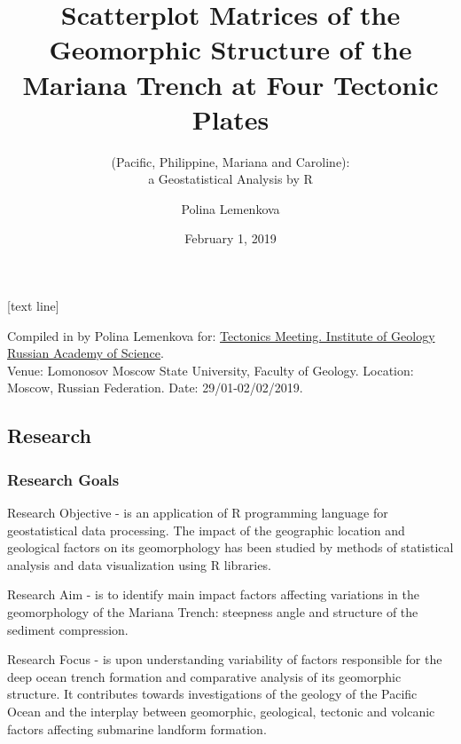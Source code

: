 \documentclass[pdflatex,compress,10pt,
	xcolor={dvipsnames,dvipsnames,svgnames,x11names,table},
	hyperref={colorlinks = true,breaklinks = true, urlcolor = NavyBlue, breaklinks = true}]{beamer}
\title{Scatterplot Matrices of the Geomorphic Structure of the Mariana Trench at Four Tectonic Plates}
\subtitle{(Pacific, Philippine, Mariana and Caroline): \\a Geostatistical Analysis by R}
\author{Polina Lemenkova}
\institute{Ocean University of China, College of Marine Geo-Sciences}
\date{February 1, 2019}
\begin{document}
\maketitle

[text line]{%
\parbox{\linewidth}{\vspace*{-8pt}Compiled in \LuaLaTeX \space by Polina Lemenkova for: \href{http://www.ginras.ru/struct/5/20/index.php}{ Tectonics Meeting. Institute of Geology Russian Academy of Science}.\\ Venue: Lomonosov Moscow State University, Faculty of Geology. Location: Moscow, Russian Federation. Date: 29/01-02/02/2019.} \hfill\insertpagenumber}




\subsection{Research}

\begin{frame}\frametitle{Research Goals}
	\begin{exampleblock}{Research Objective}
- is an application of R programming language for geostatistical data processing. The impact of the geographic location and geological factors on its geomorphology has been studied by methods of statistical analysis and data visualization using R libraries.
	\end{exampleblock}
	\begin{exampleblock}{Research Aim}
- is to identify main impact factors affecting variations in the geomorphology of the Mariana Trench: steepness angle and structure of the sediment compression. 
	\end{exampleblock}
	\begin{alertblock}{Research Focus}
- is upon understanding variability of factors responsible for the deep ocean trench formation and comparative analysis of its geomorphic structure. It contributes towards investigations of the geology of the Pacific Ocean and the interplay between geomorphic, geological, tectonic and volcanic factors affecting submarine landform formation.
	\end{alertblock}
\end{frame}
	
\end{document}
